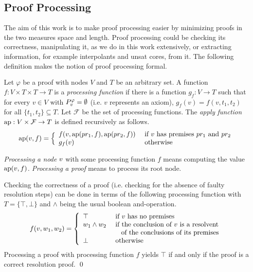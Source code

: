 \subsection{Proof Processing}
\label{sec:proofprocessing}

The aim of this work is to make proof processing easier by minimizing proofs in the two measures space and length.
Proof processing could be checking its correctness, manipulating it, as we do in this work extensively, or extracting information, for example interpolants and unsat cores, from it.
The following definition makes the notion of proof processing formal.

\begin{definition}
\label{def:proof-processing}

Let $\varphi$ be a proof with nodes $V$ and $T$ be an arbitrary set.
A function $f: V \times T \times T \rightarrow T$ is a \emph{processing function} if there is a function $g_f: V \rightarrow T$ such that for every $v \in V$ with $P_{v}^{\varphi} = \emptyset$ (i.e. $v$ represents an axiom), $g_f(v) = f(v,t_1,t_2)$ for all $\{t_1,t_2\} \subseteq T$.
Let $\mathcal{F}$ be the set of processing functions.
The \emph{apply function} $\operatorname{ap}: V \times \mathcal{F} \rightarrow T$ is defined recursively as follows.
$$
\operatorname{ap}(v,f) = \Big\{
\begin{array}{ll}
	f(v,\operatorname{ap}(pr_1,f),\operatorname{ap}(pr_2,f)) &\text{ if } v \text{ has premises } pr_1 \text{ and } pr_2\\
	g_f(v) &\text{ otherwise}\\
\end{array}
$$

\emph{Processing a node} $v$ with some processing function $f$ means computing the value $\operatorname{ap}(v,f)$.
\emph{Processing a proof} means to process its root node.

\end{definition}

\begin{example}

Checking the correctness of a proof (i.e. checking for the absence of faulty resolution steps) can be done in terms of the following processing function with $T = \{\top,\bot\}$ and $\wedge$ being the usual boolean and-operation.
$$
f(v,w_1,w_2) = \left\{
\begin{array}{ll}
	\top & \text{ if $v$ has no premises} \\
	w_1 \wedge w_2 &\text{ if the conclusion of $v$ is a resolvent}\\
								 &\hspace{0.85em} \text{ of the conclusions of its premises} \\
	\bot & \text{ otherwise}
\end{array}
\right.
$$
Processing a proof with processing function $f$ yields $\top$ if and only if the proof is a correct resolution proof.
\qed
\end{example}